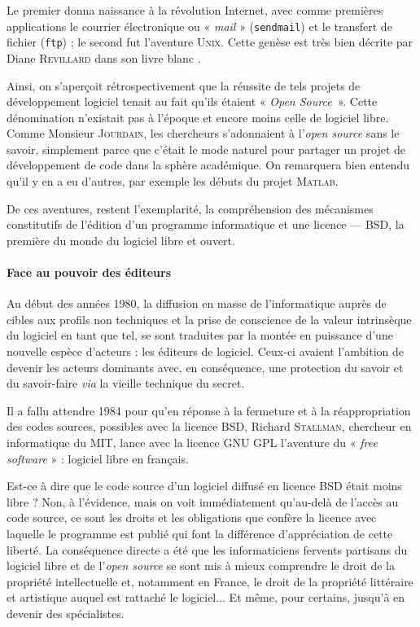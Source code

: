 Le premier donna naissance à la révolution Internet, avec comme premières applications le courrier électronique ou « \textit{mail} » (\texttt{sendmail}) et le transfert de fichier (\texttt{ftp}) ; le second fut l'aventure \textsc{Unix}. Cette genèse est très bien décrite par Diane \textsc{Revillard} dans son livre blanc  \parencite{Revillard:2005}. 

%
Ainsi, on s'aperçoit rétrospectivement que la réussite de tels projets de développement logiciel tenait au fait qu'ils étaient « \textit{Open Source}~». Cette dénomination n'existait pas à l'époque et encore moins celle de logiciel libre. Comme Monsieur \textsc{Jourdain}, les chercheurs s’adonnaient à l'\textit{open source} sans le savoir, simplement parce que c'était le mode na\-turel pour partager un projet de développement de code dans la sphè\-re académique. On remarquera bien entendu qu'il y en a eu d'autres, par exemple les débuts du projet \textsc{Matlab}. 

De ces aventures, restent l'exemplarité, la compréhension des mé\-canismes constitutifs de l'édition d'un programme informatique et une  licence --- BSD, la première du monde du logiciel libre et ouvert.

\paragraph{Face au pouvoir des éditeurs}
Au début des années 1980, la diffusion en masse de l'informatique auprès de cibles aux profils non techniques et la prise de conscience de la valeur intrinsèque du logiciel en tant que tel, se sont traduites par la montée en puissance d'une nou\-velle espèce d'acteurs : les éditeurs de logiciel. Ceux-ci avaient l'ambition de devenir les acteurs dominants avec, en conséquence, une protection du savoir et du savoir-faire \textit{via} la vieille technique du secret.

%
Il a fallu attendre 1984 pour qu'en réponse à la fermeture et à la ré\-appropriation des codes sources, possibles avec la licence BSD, Richard \textsc{Stallman}, chercheur en informatique du MIT, lance avec la licence GNU GPL l'aventure du « \textit{free software} » : logiciel libre en français. 

Est-ce à dire que le code source d'un logiciel diffusé en licence BSD était moins libre ? Non, à l'évidence, mais on voit immédiatement qu'au-delà de l'accès au code source, ce sont les droits et les obligations que confère la licence avec laquelle le programme est publié qui font la différence d'appréciation de cette liberté. La conséquence directe a été que les informaticiens fervents partisans du logiciel libre et de l'\textit{open source} se sont mis à mieux comprendre le droit de la propriété intellectuelle et, notamment en France, le droit de la propriété littéraire et artistique auquel est rattaché le logiciel... Et même, pour certains, jusqu'à en devenir des spécialistes.

